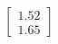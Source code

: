 \documentclass[preview]{standalone}
\begin{document}
\begin{align*}
\begin{bmatrix} 1.52 \\ 1.65 \end{bmatrix}
\end{align*}
\end{document}
